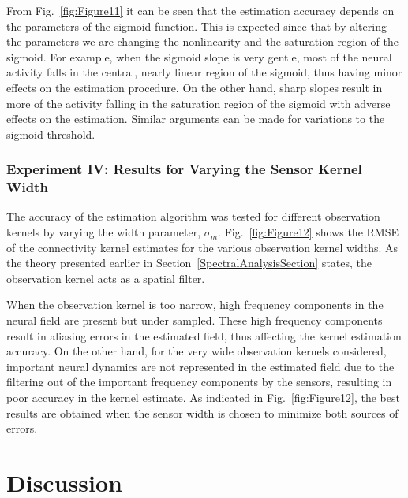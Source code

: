 \documentclass[review,authoryear,3p]{elsarticle}
\begin{document}
From Fig.~\ref{fig:Figure11} it can be seen that the estimation accuracy depends on the parameters of the sigmoid function. This is expected since that by altering the parameters we are changing the nonlinearity and the saturation region of the sigmoid. For example, when the sigmoid slope is very gentle, most of the neural activity falls in the central, nearly linear region of the sigmoid, thus having minor effects on the estimation procedure. On the other hand, sharp slopes result in more of the activity falling in the saturation region of the sigmoid with adverse effects on the estimation. Similar arguments can be made for variations to the sigmoid threshold.

\subsubsection{Experiment IV: Results for Varying the Sensor Kernel Width}
The accuracy of the estimation algorithm was tested for different observation kernels by varying the width parameter, $\sigma_m$. Fig.~\ref{fig:Figure12} shows the RMSE of the connectivity kernel estimates for the various observation kernel widths. As the theory presented earlier in Section~\ref{SpectralAnalysisSection} states, the observation kernel acts as a spatial filter. 

When the observation kernel is too narrow, high frequency components in the neural field are present but under sampled. These high frequency components result in aliasing errors in the estimated field, thus affecting the kernel estimation accuracy. On the other hand, for the very wide observation kernels considered, important neural dynamics are not represented in the estimated field due to the filtering out of the important frequency components by the sensors, resulting in poor accuracy in the kernel estimate. As indicated in Fig.~\ref{fig:Figure12}, the best results are obtained when the sensor width is chosen to minimize both sources of errors.

\section{Discussion}\label{DiscussionSection}
\end{document}

